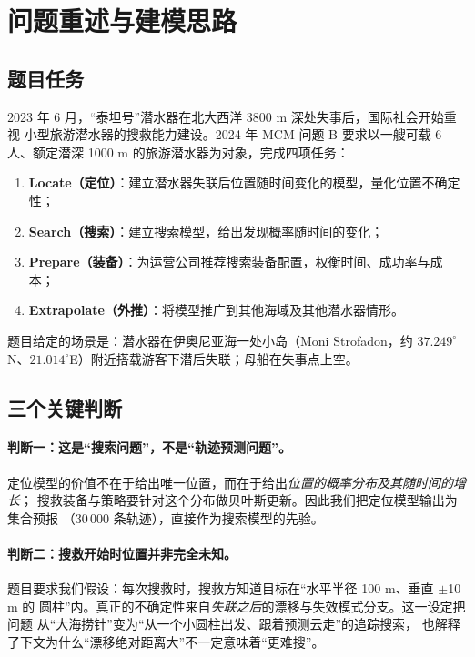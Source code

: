 \section{问题重述与建模思路}

\subsection{题目任务}

2023 年 6 月，“泰坦号”潜水器在北大西洋 3800 m 深处失事后，国际社会开始重视
小型旅游潜水器的搜救能力建设。2024 年 MCM 问题 B 要求以一艘可载 6 人、额定潜深
1000 m 的旅游潜水器为对象，完成四项任务：

\begin{enumerate}[leftmargin=1.8em,itemsep=0pt]
\item \textbf{Locate（定位）}：建立潜水器失联后位置随时间变化的模型，量化位置不确定性；
\item \textbf{Search（搜索）}：建立搜索模型，给出发现概率随时间的变化；
\item \textbf{Prepare（装备）}：为运营公司推荐搜索装备配置，权衡时间、成功率与成本；
\item \textbf{Extrapolate（外推）}：将模型推广到其他海域及其他潜水器情形。
\end{enumerate}

题目给定的场景是：潜水器在伊奥尼亚海一处小岛（Moni Strofadon，约
$37.249^\circ$N、$21.014^\circ$E）附近搭载游客下潜后失联；母船在失事点上空。

\subsection{三个关键判断}

\paragraph{判断一：这是“搜索问题”，不是“轨迹预测问题”。}
定位模型的价值不在于给出唯一位置，而在于给出\emph{位置的概率分布及其随时间的增长}；
搜救装备与策略要针对这个分布做贝叶斯更新。因此我们把定位模型输出为集合预报
（30\,000 条轨迹），直接作为搜索模型的先验。

\paragraph{判断二：搜救开始时位置并非完全未知。}
题目要求我们假设：每次搜救时，搜救方知道目标在“水平半径 100 m、垂直 $\pm$10 m 的
圆柱”内。真正的不确定性来自\emph{失联之后}的漂移与失效模式分支。这一设定把问题
从“大海捞针”变为“从一个小圆柱出发、跟着预测云走”的追踪搜索，
也解释了下文为什么“漂移绝对距离大”不一定意味着“更难搜”。

